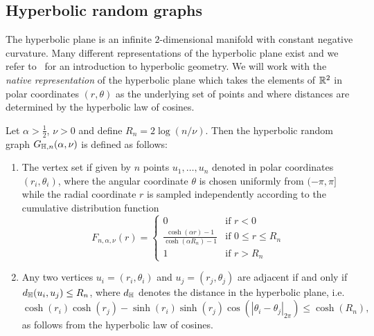 \subsection{Hyperbolic random graphs}\label{ssec:hyperbolic_model}

The hyperbolic plane is an infinite $2$-dimensional manifold with constant negative curvature. Many different representations of the hyperbolic plane exist and we refer to~\cite{anderson2006hyperbolic} \cite{katok1992fuchsian} \cite{beardon2012geometry} for an introduction to hyperbolic geometry.  We will work with the \emph{native representation} of the hyperbolic plane which takes the elements of ${\mathbb R}^2$ in polar coordinates $(r,\theta)$ as the underlying set of points and where distances are determined by the hyperbolic law of cosines.

Let $\alpha > \frac{1}{2}$, $\nu > 0$ and define $R_n = 2\log(n/\nu)$. Then the hyperbolic random graph $G_{\mathbb{H},n}(\alpha, \nu)$ is defined as follows:
\begin{enumerate}
\item The vertex set if given by $n$ points $u_1, \dots, u_n$ denoted in polar coordinates $(r_i, \theta_i)$, where the angular coordinate $\theta$ is chosen uniformly from $(-\pi,\pi]$ while the radial coordinate $r$ is sampled independently according to the cumulative distribution function
\begin{equation}\label{eq:def_hyperbolic_point_distribution}
	F_{n,\alpha,\nu}(r) = \begin{cases}
		0 &\mbox{if } r < 0\\
		\frac{\cosh(\alpha r)-1}{\cosh(\alpha R_n) - 1} &\mbox{if } 0 \le r \le R_n\\
		1&\mbox{if } r > R_n
	\end{cases}
\end{equation}
\item Any two vertices $u_i=(r_i,\theta_i)$ and $u_j=(r_j,\theta_j)$ are adjacent if and only if $d_{\mathbb{H}}(u_i,u_j) \le R_n$, where $d_{\mathbb{H}}$ denotes the distance in the hyperbolic plane, i.e.
\[
	\cosh(r_i) \cosh(r_j) - \sinh(r_i) \sinh( r_j) \cos(|\theta_i-\theta_j|_{2\pi}) \le \cosh(R_n),
\]
as follows from the hyperbolic law of cosines.%
\end{enumerate}

